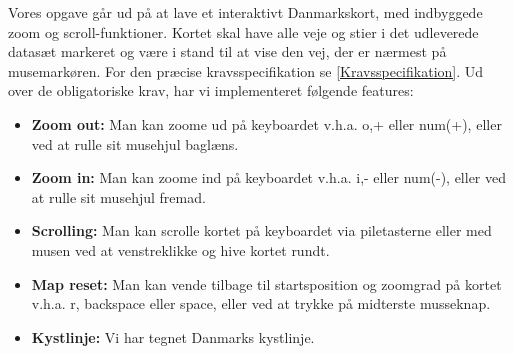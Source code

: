 Vores opgave går ud på at lave et interaktivt Danmarkskort, med indbyggede zoom og scroll-funktioner. Kortet skal have alle veje og stier i det udleverede datasæt markeret og være i stand til at vise den vej, der er nærmest på musemarkøren. For den præcise kravsspecifikation se \ref{Kravsspecifikation}.
\newline \newline
Ud over de obligatoriske krav, har vi implementeret følgende features:
\begin{itemize}
	\item \textbf{Zoom out:} Man kan zoome ud på keyboardet v.h.a. o,+ eller num(+), eller ved at rulle sit musehjul baglæns.
	\item \textbf{Zoom in:} Man kan zoome ind på keyboardet v.h.a. i,- eller num(-), eller ved at rulle sit musehjul fremad.
	\item \textbf{Scrolling:} Man kan scrolle kortet på keyboardet via piletasterne eller med musen ved at venstreklikke og hive kortet rundt.
	\item \textbf{Map reset:} Man kan vende tilbage til startsposition og zoomgrad på kortet v.h.a. r, backspace eller space, eller ved at trykke på midterste musseknap.
	\item \textbf{Kystlinje:} Vi har tegnet Danmarks kystlinje.
\end{itemize}
